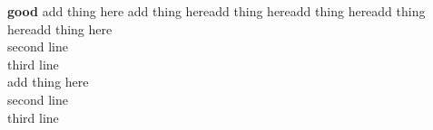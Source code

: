\documentclass[8pt,a4paper]{article}
\newcommand{\topic}[1]{\textbf{#1}}
\begin{document}
\small
\begin{multicols*}{2}
    \noindent \topic{good}
    \noindent add thing here add thing hereadd thing hereadd thing hereadd thing hereadd thing here \\[-1mm] second line \\[-1mm] third line \\[-1mm]
     add thing here \\[-1mm] second line \\[-1mm] third line \\[-1mm]
    \end{multicols*}
\end{document}
